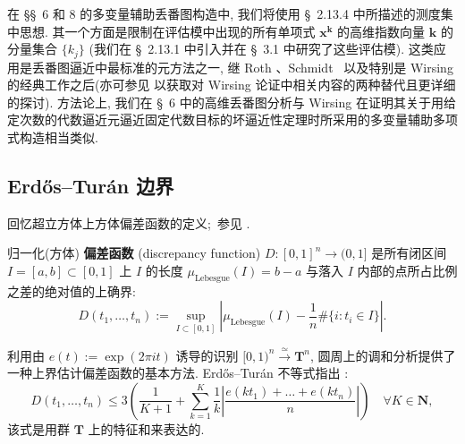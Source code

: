 在 \S\S~6 和 8 的多变量辅助丢番图构造中, 我们将使用 \S~2.13.4 中所描述的测度集中思想.
其一个方面是限制在评估模中出现的所有单项式 $\mathbf{x}^{\mathbf{k}}$ 的高维指数向量 $\mathbf{k}$ 的分量集合 $\{k_j\}$ (我们在 \S~2.13.1 中引入并在 \S~3.1 中研究了这些评估模).
这类应用是丢番图逼近中最标准的元方法之一, 继 Roth \cite[§ 6.3.5]{BG06}、Schmidt\footnotemark[19]\  \cite[§ 7.5.15]{BG06} 以及特别是 Wirsing \cite[§ 4.2]{Wir71} 的经典工作之后(亦可参见 \cite[Theorem 7.2.1]{Sto74} 以获取对 Wirsing 论证中相关内容的两种替代且更详细的探讨).
方法论上, 我们在 \S~6 中的高维丢番图分析与 Wirsing 在证明其关于用给定次数的代数逼近元逼近固定代数目标的坏逼近性定理时所采用的多变量辅助多项式构造相当类似.

\subsection{Erd\H{o}s--Tur{\'a}n 边界}\label{sec:4.1}

回忆超立方体上方体偏差函数的定义;\ 参见 \cite[§ 2.5.3]{CDT21}.

\begin{definition}\label{def:4.1.1}
归一化(方体) \textbf{偏差函数} (discrepancy function) $D: [0,1]^n \to (0,1]$ 是所有闭区间 $I = [a,b] \subset [0,1]$ 上 $I$ 的长度 $\mu_{\text{Lebesgue}}(I) = b - a$ 与落入 $I$ 内部的点所占比例之差的绝对值的上确界:
\[ D(t_1,\ldots,t_n) := \sup_{I \subset [0,1]} \left| \mu_{\text{Lebesgue}}(I) - \frac{1}{n} \#\{i : t_i \in I\} \right|. \]
\end{definition}

利用由 $e(t) := \exp(2\pi i t)$ 诱导的识别 $[0,1)^n \stackrel{\simeq}{\to} \mathbf{T}^n$, 圆周上的调和分析提供了一种上界估计偏差函数的基本方法.
Erd\H{o}s--Tur{\'a}n 不等式指出 \cite[Theorem 1.14]{DT97}:
\begin{equation}\label{eq:4.1.2}
D(t_1, \dots, t_n) \le 3 \left( \frac{1}{K+1} + \sum_{k=1}^{K} \frac{1}{k} \left| \frac{e(kt_1) + \dots + e(kt_n)}{n} \right| \right) \quad \forall K \in \mathbf{N},
\end{equation}
该式是用群 $\mathbf{T}$ 上的特征和来表达的.

